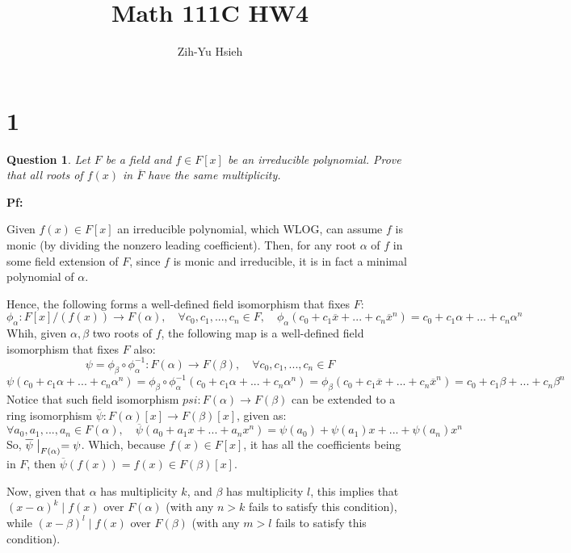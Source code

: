 \documentclass{article}
\title{Math 111C HW4}
\author{Zih-Yu Hsieh}
\newtheorem{question}{Question}
\begin{document}
\maketitle

\section*{1}
\begin{myBox}[]{}
    \begin{question}
        Let $F$ be a field and $f\in F[x]$ be an irreducible polynomial. Prove that all roots of $f(x)$ in $\overline{F}$ have the same multiplicity.
    \end{question}
\end{myBox}

\textbf{Pf:}

Given $f(x)\in F[x]$ an irreducible polynomial, which WLOG, can assume $f$ is monic (by dividing the nonzero leading coefficient). Then, for any root $\alpha$ of $f$ in some field extension of $F$, since $f$ is monic and irreducible, it is in fact a minimal polynomial of $\alpha$.

Hence, the following forms a well-defined field isomorphism that fixes $F$:
$$\phi_\alpha:F[x]/(f(x))\rightarrow F(\alpha),\quad \forall c_0,c_1,...,c_n\in F,\quad \phi_\alpha(c_0+c_1\overline{x}+...+c_n\overline{x}^n) = c_0+c_1\alpha+...+c_n\alpha^n$$
Whih, given $\alpha,\beta$ two roots of $f$, the following map is a well-defined field isomorphism that fixes $F$ also:
$$\psi = \phi_\beta\circ \phi_\alpha^{-1}:F(\alpha)\rightarrow F(\beta),\quad \forall c_0,c_1,...,c_n\in F$$
$$\psi(c_0+c_1\alpha+...+c_n\alpha^n) = \phi_\beta\circ \phi_\alpha^{-1}(c_0+c_1\alpha+...+c_n\alpha^n) = \phi_\beta(c_0+c_1\overline{x}+...+c_n\overline{x}^n) = c_0+c_1\beta+...+c_n\beta^n$$
Notice that such field isomorphism $psi:F(\alpha)\rightarrow F(\beta)$ can be extended to a ring isomorphism $\overline{\psi}:F(\alpha)[x]\rightarrow F(\beta)[x]$, given as:
$$\forall a_0,a_1,...,a_n\in F(\alpha),\quad \overline{\psi}(a_0+a_1x+...+a_nx^n)=\psi(a_0)+\psi(a_1)x+...+\psi(a_n)x^n$$
So, $\overline{\psi}\bigm|_{F(\alpha)} = \psi$. Which, because $f(x)\in F[x]$, it has all the coefficients being in $F$, then $\overline{\psi}(f(x))=f(x)\in F(\beta)[x]$.

\hfil

Now, given that $\alpha$ has multiplicity $k$, and $\beta$ has multiplicity $l$, this implies that $(x-\alpha)^k\mid f(x)$ over $F(\alpha)$ (with any $n>k$ fails to satisfy this condition), while $(x-\beta)^l\mid f(x)$ over $F(\beta)$ (with any $m>l$ fails to satisfy this condition).
\end{document}
